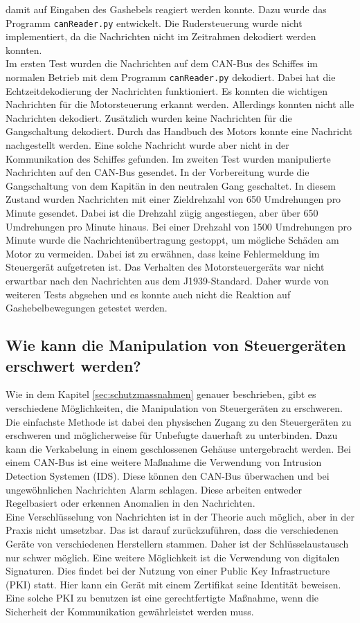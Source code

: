 damit auf Eingaben des Gashebels reagiert werden konnte. Dazu wurde das Programm \texttt{canReader.py} entwickelt. 
Die Rudersteuerung wurde nicht implementiert, da die Nachrichten nicht im Zeitrahmen dekodiert werden konnten.
\\
Im ersten Test wurden die Nachrichten auf dem CAN-Bus des Schiffes im normalen Betrieb mit dem Programm \texttt{canReader.py} dekodiert.
Dabei hat die Echtzeitdekodierung der Nachrichten funktioniert. Es konnten die wichtigen Nachrichten für die Motorsteuerung
erkannt werden. Allerdings konnten nicht alle Nachrichten dekodiert. Zusätzlich wurden keine Nachrichten für die Gangschaltung
dekodiert. Durch das Handbuch
des Motors konnte eine Nachricht nachgestellt werden. Eine solche Nachricht wurde aber nicht in der Kommunikation des Schiffes gefunden.
Im zweiten Test wurden manipulierte Nachrichten auf den CAN-Bus gesendet. In der Vorbereitung wurde die Gangschaltung von dem Kapitän in den neutralen
Gang geschaltet. In diesem Zustand wurden Nachrichten mit einer Zieldrehzahl von 650 Umdrehungen pro Minute gesendet. Dabei ist die 
Drehzahl zügig angestiegen, aber über 650 Umdrehungen pro Minute hinaus. Bei einer Drehzahl von 1500 Umdrehungen pro Minute wurde die
Nachrichtenübertragung gestoppt, um mögliche Schäden am Motor zu vermeiden. Dabei ist zu erwähnen, dass keine Fehlermeldung im Steuergerät 
aufgetreten ist. Das Verhalten des Motorsteuergeräts war nicht erwartbar nach den Nachrichten aus dem J1939-Standard. Daher
wurde von weiteren Tests abgsehen und es konnte auch nicht die Reaktion auf Gashebelbewegungen getestet werden. 

\subsection{Wie kann die Manipulation von Steuergeräten erschwert werden?}
Wie in dem Kapitel \ref{sec:schutzmassnahmen} genauer beschrieben, gibt es verschiedene Möglichkeiten, die Manipulation von Steuergeräten zu erschweren.
Die einfachste Methode ist dabei den physischen Zugang zu den Steuergeräten zu erschweren und möglicherweise für Unbefugte dauerhaft zu unterbinden.
Dazu kann die Verkabelung in einem geschlossenen Gehäuse untergebracht werden. 
Bei einem CAN-Bus ist eine weitere Maßnahme die Verwendung von Intrusion Detection Systemen (IDS).
Diese können den CAN-Bus überwachen und bei ungewöhnlichen Nachrichten Alarm schlagen. Diese arbeiten entweder Regelbasiert oder erkennen Anomalien in den Nachrichten.
\\
Eine Verschlüsselung von Nachrichten ist in der Theorie auch möglich, aber in der Praxis nicht umsetzbar. Das ist darauf zurückzuführen, dass die verschiedenen
Geräte von verschiedenen Herstellern stammen. Daher ist der Schlüsselaustausch nur schwer möglich. Eine weitere Möglichkeit ist die Verwendung von digitalen Signaturen.
Dies findet bei der Nutzung von einer Public Key Infrastructure (PKI) statt. Hier kann ein Gerät mit einem Zertifikat seine Identität beweisen. 
Eine solche PKI zu benutzen ist eine gerechtfertigte Maßnahme, wenn die Sicherheit der Kommunikation gewährleistet werden muss. \\

